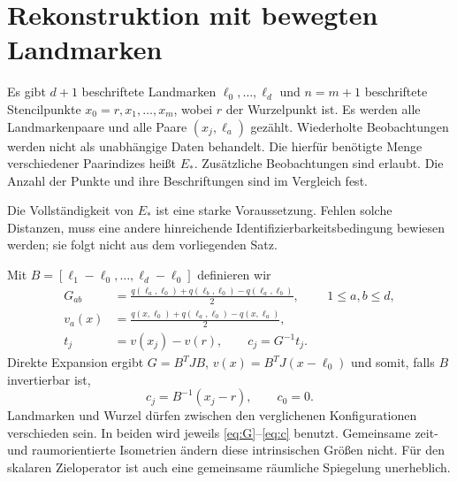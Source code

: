 \documentclass[11pt,a4paper]{article}
\theoremstyle{definition}\newtheorem{definition}{Definition}
\theoremstyle{remark}\newtheorem*{remark}{Bemerkung}
\begin{document}
\section{Rekonstruktion mit bewegten Landmarken}

Es gibt $d+1$ beschriftete Landmarken $\ell_0,\ldots,\ell_d$ und $n=m+1$ beschriftete Stencilpunkte $x_0=r,x_1,\ldots,x_m$, wobei $r$ der Wurzelpunkt ist. Es werden alle Landmarkenpaare und alle Paare $(x_j,\ell_a)$ gezählt. Wiederholte Beobachtungen werden nicht als unabhängige Daten behandelt. Die hierfür benötigte Menge verschiedener Paarindizes heißt $E_*$. Zusätzliche Beobachtungen sind erlaubt. Die Anzahl der Punkte und ihre Beschriftungen sind im Vergleich fest.

Die Vollständigkeit von $E_*$ ist eine starke Voraussetzung. Fehlen solche Distanzen, muss eine andere hinreichende Identifizierbarkeitsbedingung bewiesen werden; sie folgt nicht aus dem vorliegenden Satz.

Mit $B=[\ell_1-\ell_0,\ldots,\ell_d-\ell_0]$ definieren wir
\begin{align}
 G_{ab}&=\frac{q(\ell_a,\ell_0)+q(\ell_b,\ell_0)-q(\ell_a,\ell_b)}2,
 &&1\leq a,b\leq d,\label{eq:G}\\
 v_a(x)&=\frac{q(x,\ell_0)+q(\ell_a,\ell_0)-q(x,\ell_a)}2,\\
 t_j&=v(x_j)-v(r),\qquad c_j=G^{-1}t_j.\label{eq:c}
\end{align}
Direkte Expansion ergibt $G=B^TJB$, $v(x)=B^TJ(x-\ell_0)$ und somit, falls $B$ invertierbar ist,
\begin{equation}\label{eq:coords}
 c_j=B^{-1}(x_j-r),\qquad c_0=0.
\end{equation}
Landmarken und Wurzel dürfen zwischen den verglichenen Konfigurationen verschieden sein. In beiden wird jeweils \eqref{eq:G}--\eqref{eq:c} benutzt. Gemeinsame zeit- und raumorientierte Isometrien ändern diese intrinsischen Größen nicht. Für den skalaren Zieloperator ist auch eine gemeinsame räumliche Spiegelung unerheblich.
\end{document}
